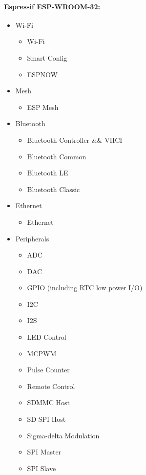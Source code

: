 \paragraph{Espressif ESP-WROOM-32:} \cite{ESP32API}
\begin{multicols}{2}
\begin{itemize}
	\item Wi-Fi
	\begin{itemize}
		\setlength\itemsep{1pt}
		\item Wi-Fi
		\item Smart Config
		\item ESPNOW
	\end{itemize}
	\item Mesh
	\begin{itemize}
		\setlength\itemsep{1pt}
		\item ESP Mesh
	\end{itemize}
	\item Bluetooth
	\begin{itemize}
		\setlength\itemsep{1pt}
		\item Bluetooth Controller \&\& VHCI
		\item Bluetooth Common
		\item Bluetooth LE
		\item Bluetooth Classic
	\end{itemize}
	\item Ethernet
	\begin{itemize}
		\setlength\itemsep{1pt}
		\item Ethernet
	\end{itemize}
	\item Peripherals
	\begin{itemize}
		\setlength\itemsep{1pt}
		\item ADC
		\item DAC
		\item GPIO (including RTC low power I/O)
		\item I2C
		\item I2S
		\item LED Control
		\item MCPWM
		\item Pulse Counter
		\item Remote Control
		\item SDMMC Host
		\item SD SPI Host
		\item Sigma-delta Modulation
		\item SPI Master
		\item SPI Slave

\end{itemize}
\end{itemize}
\end{multicols}
